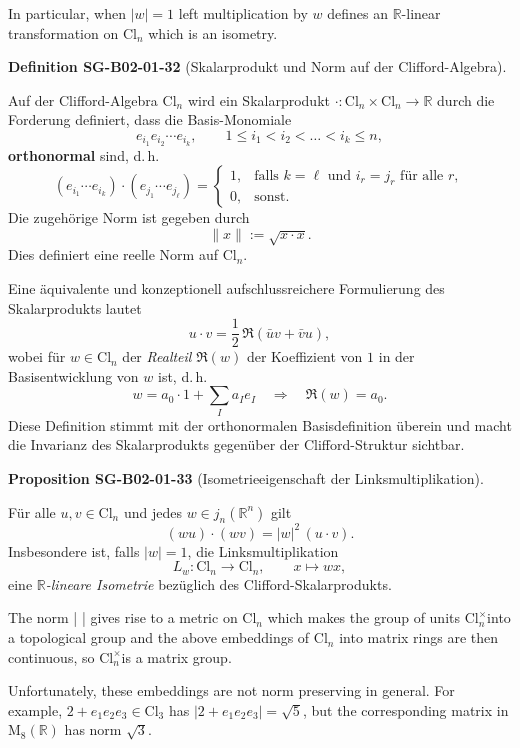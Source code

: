 \documentclass[10pt, letterpaper]{article}
\newcommand{\R}{\mathbb{R}}
\newcommand{\Cl}{\mathrm{Cl}}
\newcommand{\CustomHeading}[3]{%
  \par\medskip\noindent%
  \textbf{#1 #2} \textnormal{(#3)}.\enskip%
}
\newenvironment{DEF}[2]{\begin{unitbox}\CustomHeading{Definition}{#1}{#2}}{\end{unitbox}}
\newenvironment{PROP}[2]{\begin{unitbox}\CustomHeading{Proposition}{#1}{#2}}{\end{unitbox}}
\begin{document}
In particular, when $|w|=1$ left multiplication by $w$ defines an $\mathbb{R}$-linear transformation on $\mathrm{Cl}_{n}$ which is an isometry. 




\begin{DEF}{SG-B02-01-32}{Skalarprodukt und Norm auf der Clifford-Algebra}
Auf der Clifford-Algebra $\Cl_n$ wird ein Skalarprodukt
\(\cdot : \Cl_n \times \Cl_n \to \R\)
durch die Forderung definiert, dass die Basis-Monomiale
\[
e_{i_1} e_{i_2} \cdots e_{i_k}, 
\qquad 1 \le i_1 < i_2 < \dots < i_k \le n,
\]
\textbf{orthonormal} sind, d.\,h.
\[
(e_{i_1}\cdots e_{i_k}) \cdot (e_{j_1}\cdots e_{j_\ell})
=
\begin{cases}
1, & \text{falls } k=\ell \text{ und } i_r=j_r \text{ für alle } r,\\[3pt]
0, & \text{sonst.}
\end{cases}
\]
Die zugehörige Norm ist gegeben durch
\[
\lVert x\rVert := \sqrt{x \cdot x}.
\]
Dies definiert eine reelle Norm auf $\Cl_n$.

Eine äquivalente und konzeptionell aufschlussreichere Formulierung des Skalarprodukts lautet
\[
u \cdot v = \frac{1}{2}\,\Re(\bar{u}v + \bar{v}u),
\]
wobei für $w \in \Cl_n$ der \emph{Realteil} $\Re(w)$ der Koeffizient von $1$
in der Basisentwicklung von $w$ ist, d.\,h.
\[
w = a_0 \cdot 1 + \sum_I a_I e_I 
\quad\Longrightarrow\quad 
\Re(w) = a_0.
\]
Diese Definition stimmt mit der orthonormalen Basisdefinition überein und
macht die Invarianz des Skalarprodukts gegenüber der Clifford-Struktur
sichtbar.
\end{DEF}




\begin{PROP}{SG-B02-01-33}{Isometrieeigenschaft der Linksmultiplikation}
Für alle $u,v\in \Cl_n$ und jedes $w\in j_n(\R^n)$ gilt
\[
(wu)\cdot(wv)=\lvert w\rvert^2\,(u\cdot v).
\]
Insbesondere ist, falls $\lvert w\rvert=1$, die Linksmultiplikation
\[
L_w:\Cl_n\to\Cl_n,\qquad x\mapsto wx,
\]
eine \emph{$\R$-lineare Isometrie} bezüglich des Clifford-Skalarprodukts.
\end{PROP}




The norm | | gives rise to a metric on $\mathrm{Cl}_{n}$ which makes the group of units $\mathrm{Cl}_{n}^{\times}$into a topological group and the above embeddings of $\mathrm{Cl}_{n}$ into matrix rings are then continuous, so $\mathrm{Cl}_{n}^{\times}$is a matrix group. 

Unfortunately, these embeddings are not norm preserving in general. For example, $2+e_{1} e_{2} e_{3} \in \mathrm{Cl}_{3}$ has $\left|2+e_{1} e_{2} e_{3}\right|=\sqrt{5}$, but the corresponding matrix in $\mathrm{M}_{8}(\mathbb{R})$ has norm $\sqrt{3}$. 
\end{document}
